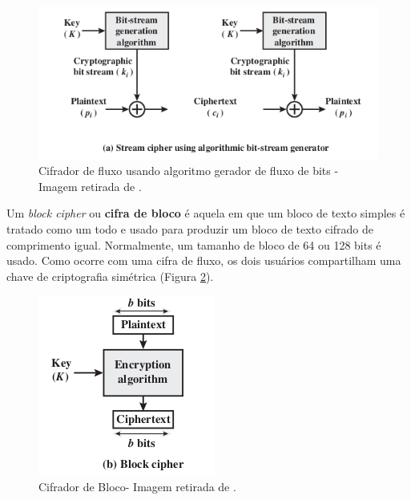             
                \begin{figure}[h]
                     \centering
                     \includegraphics[scale=0.7]{figuras/capitulo_2/stream_cipher_generator.png}
                     \caption{Cifrador de fluxo usando algoritmo gerador de fluxo de bits - Imagem retirada de \cite{cryptograpy_and_network_stallings}.}
                     \label{fig:imagem_stream_cipher}
                \end{figure}
        
            Um \textit{block cipher} ou \textbf{cifra de bloco} é aquela em que um bloco de texto simples é tratado como um todo e usado para produzir um bloco de texto cifrado de comprimento igual. Normalmente, um tamanho de bloco de 64 ou 128 bits é usado. Como ocorre com uma cifra de fluxo, os dois usuários compartilham uma chave de criptografia simétrica (Figura \ref{fig:imagem_block_cipher}).

                \begin{figure}[h]
                     \centering
                     \includegraphics[scale=0.7]{figuras/capitulo_2/block_cipher.png}
                     \caption{Cifrador de Bloco- Imagem retirada de \cite{cryptograpy_and_network_stallings}.}
                     \label{fig:imagem_block_cipher}
                \end{figure}
            
